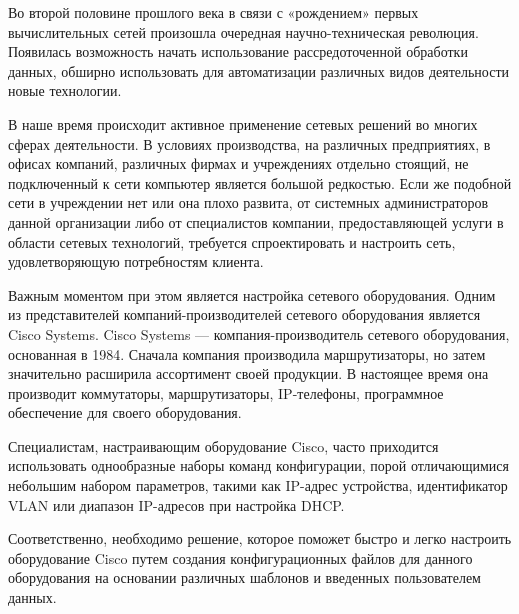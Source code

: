\Introduction

Во второй половине прошлого века в связи с «рождением» первых
вычислительных сетей произошла очередная научно-техническая революция. Появилась возможность начать использование рассредоточенной
обработки данных, обширно использовать для автоматизации различных
видов деятельности новые технологии. 



В наше время происходит активное применение сетевых решений во многих сферах деятельности. В условиях производства, на различных предприятиях,
в офисах компаний, различных фирмах и учреждениях отдельно стоящий, не подключенный к сети компьютер является большой редкостью. Если же подобной сети в учреждении нет или она плохо развита, от системных администраторов данной организации либо от специалистов компании, предоставляющей услуги в области сетевых технологий, требуется спроектировать и настроить сеть, удовлетворяющую потребностям клиента.

Важным моментом при этом является настройка сетевого оборудования. Одним из представителей компаний-производителей сетевого оборудования является Cisco Systems. Cisco Systems — компания-производитель
сетевого оборудования, основанная в 1984. Сначала компания производила маршрутизаторы, но затем значительно расширила ассортимент своей продукции. В настоящее время она производит коммутаторы, маршрутизаторы,
IP-телефоны, программное обеспечение для своего оборудования.



Специалистам, настраивающим оборудование Cisco, часто приходится использовать однообразные наборы команд конфигурации, порой отличающимися небольшим набором параметров, такими как IP-адрес устройства, идентификатор VLAN или диапазон IP-адресов при настройка DHCP.


Соответственно, необходимо решение, которое поможет быстро и легко настроить оборудование Cisco путем создания конфигурационных файлов для данного оборудования на основании различных шаблонов и введенных пользователем данных.